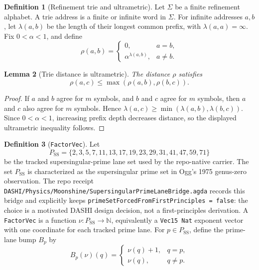 \documentclass[11pt]{article}
\theoremstyle{definition}
\newtheorem{definition}{Definition}[section]
\theoremstyle{plain}
\newtheorem{lemma}[definition]{Lemma}
\theoremstyle{remark}
\begin{document}
\begin{definition}[Refinement trie and ultrametric]
Let \(\Sigma\) be a finite refinement alphabet. A trie address is a finite or
infinite word in \(\Sigma\). For infinite addresses \(a,b\), let
\(\lambda(a,b)\) be the length of their longest common prefix, with
\(\lambda(a,a)=\infty\). Fix \(0<\alpha<1\), and define
\[
\rho(a,b)=
\begin{cases}
0, & a=b,\\
\alpha^{\lambda(a,b)}, & a\neq b.
\end{cases}
\]
\end{definition}

\begin{lemma}[Trie distance is ultrametric]
The distance \(\rho\) satisfies
\[
\rho(a,c)\leq \max(\rho(a,b),\rho(b,c)).
\]
\end{lemma}
\begin{proof}
If \(a\) and \(b\) agree for \(m\) symbols, and \(b\) and \(c\) agree for
\(m\) symbols, then \(a\) and \(c\) also agree for \(m\) symbols. Hence
\(\lambda(a,c)\geq \min(\lambda(a,b),\lambda(b,c))\). Since
\(0<\alpha<1\), increasing prefix depth decreases distance, so the displayed
ultrametric inequality follows.
\end{proof}

\begin{definition}[\texttt{FactorVec}]
Let
\[
P_{\mathrm{SS}}=\{2,3,5,7,11,13,17,19,23,29,31,41,47,59,71\}
\]
be the tracked supersingular-prime lane set used by the repo-native carrier.
The set \(P_{\mathrm{SS}}\) is characterized as the supersingular prime set in
Ogg's 1975 genus-zero observation. The repo receipt
\texttt{DASHI/Physics/Moonshine/SupersingularPrimeLaneBridge.agda} records this
bridge and explicitly keeps
\texttt{primeSetForcedFromFirstPrinciples = false}: the choice is a motivated
DASHI design decision, not a first-principles derivation.
A \texttt{FactorVec} is a function \(\nu:P_{\mathrm{SS}}\to\mathbb{N}\), equivalently a
\texttt{Vec15 Nat} exponent vector with one coordinate for each tracked prime
lane. For \(p\in P_{\mathrm{SS}}\), define the prime-lane bump \(B_p\) by
\[
B_p(\nu)(q)=
\begin{cases}
\nu(q)+1, & q=p,\\
\nu(q), & q\neq p.
\end{cases}
\]
\end{definition}
\end{document}
